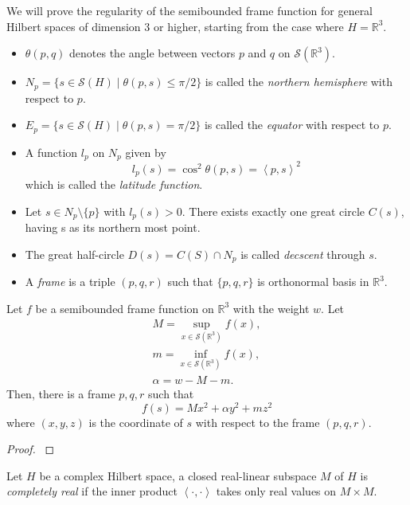  We will prove the regularity of the semibounded frame function for general Hilbert spaces of dimension 3 or higher, starting from the case where \(H=\mathbb{R}^3\).
    \begin{itemize}
        \item \(\theta(p,q)\) denotes the angle between vectors \(p\) and \(q\) on \(\mathcal{S}(\mathbb{R}^3)\).
        \item \(N_p= \{s \in \mathcal{S}(H) \mid \theta(p,s) \le \pi/2\}\) is called the \emph{northern hemisphere} with respect to \(p\).
        \item \(E_p= \{s \in \mathcal{S}(H) \mid \theta(p,s)=\pi/2\}\) is called the \emph{equator} with respect to \(p\).
        \item A function \(l_p\) on \(N_p\) given by \[l_p(s)=\cos^2 \theta(p,s)=\left \langle p,s \right \rangle^2\] which is called the \emph{latitude function}.
        \item Let \(s \in N_p \setminus \{p\}\) with \(l_p(s)>0\). There exists exactly one great circle \(C(s)\), having s as its northern most point.
        \item The great half-circle \(D(s)=C(S) \cap N_p\) is called \emph{decscent} through \(s\).
        \item A \emph{frame} is a triple \((p,q,r)\) such that \(\{p,q,r\}\) is orthonormal basis in \(\mathbb{R}^3\).
     \end{itemize}
\begin{theorem}
    \label{quaratic form-r3}
    Let \(f\) be a semibounded frame function on \(\mathbb{R}^3\) with the weight \(w\). Let \begin{gather*}
        M=\sup_{x \in \mathcal{S}(\mathbb{R}^3)} f(x), \\
        m=\inf_{x \in \mathcal{S}(\mathbb{R}^3)} f(x), \\
        \alpha=w-M-m.
    \end{gather*}
Then, there is a frame \(p,q,r\) such that
\[f(s)=Mx^2+\alpha y^2 + m z^2\]
where \((x,y,z)\) is the coordinate of \(s\) with respect to the frame \((p,q,r)\).
\begin{proof}
    \cite[Theorem 3.2.13]{MR1256736}
\end{proof}
\end{theorem}

 Let \(H\) be a complex Hilbert space, a closed real-linear subspace \(M\) of \(H\) is \emph{completely real} if the inner product \(\left \langle \cdot,\cdot \right \rangle\) takes only real values on \(M\times M\).

